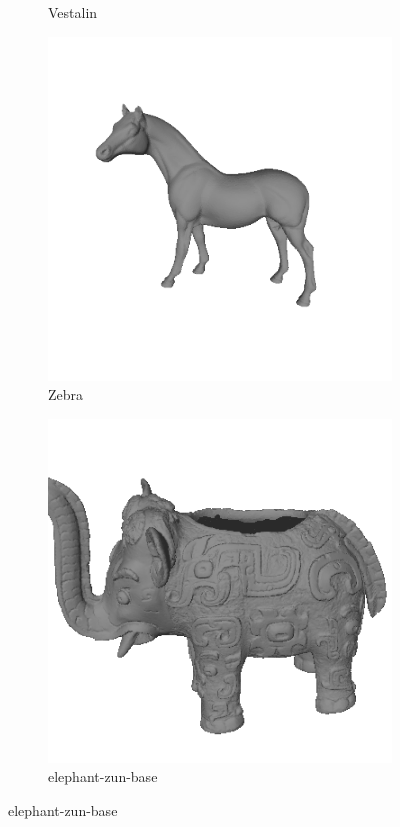 \begin{figure}[!h]
\begin{subfigure}[b]{0.23\linewidth}
		\caption{Vestalin}
	\end{subfigure}
	\begin{subfigure}[b]{0.23\linewidth}
		\includegraphics[width=\linewidth]{./Figures/train-dataset/42.zebra.png}
		\caption{Zebra}
	\end{subfigure}
	\begin{subfigure}[b]{0.23\linewidth}
		\includegraphics[width=\linewidth]{./Figures/train-dataset/43.elephant-zun-base.png}
		\caption{elephant-zun-base}
	\end{subfigure}


\end{figure}

